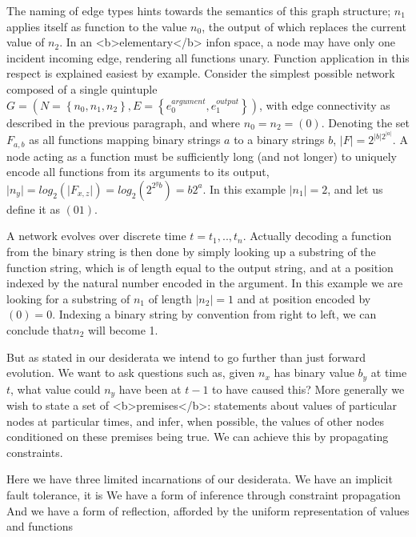 The naming of edge types hints towards the semantics of this graph structure; $n_1$ applies itself as function to the value $n_0$, the output of which replaces the current value of $n_2$.
In an <b>elementary</b> infon space, a node may have only one incident incoming edge, rendering all functions unary.
Function application in this respect is explained easiest by example.
Consider the simplest possible network composed of a single quintuple $G = (N=\left\{n_0, n_1, n_2\right\},E=\left\{e_0^{argument},e_1^{output}\right\})$, with edge connectivity as described in the previous paragraph, and where $n_0 = n_2 = (0)$.
Denoting the set $F_{a,b}$ as all functions mapping binary strings $a$ to a binary strings $b$, $\vert F \vert = 2^{{\vert b \vert}2^{\vert a \vert}}$.
A node acting as a function must be sufficiently long (and not longer) to uniquely encode all functions from its arguments to its output, $ \vert n_y \vert = log_2(\vert F_{x,z} \vert) = log_2\left(2^{2^yb}\right)=b2^a$.
In this example $\vert n_1 \vert = 2$, and let us define it as $(01)$.

A network evolves over discrete time $t=t_1,..,t_n$.
Actually decoding a function from the binary string is then done by simply looking up a substring of the function string, which is of length equal to the output string, and at a position indexed by the natural number encoded in the argument.
In this example we are looking for a substring of $n_1$ of length $\vert n_2 \vert = 1$ and at position encoded by $(0) = 0$.
Indexing a binary string by convention from right to left, we can conclude that$ n_2$ will become 1.

But as stated in our desiderata we intend to go further than just forward evolution.
We want to ask questions such as, given $n_x$ has binary value $b_y$ at time $t$, what value could $n_y$ have been at $t-1$ to have caused this?
More generally we wish to state a set of <b>premises</b>: statements about values of particular nodes at particular times, and infer, when possible, the values of other nodes conditioned on these premises being true.
We can achieve this by propagating constraints.

Here we have three limited incarnations of our desiderata.
We have an implicit fault tolerance, it is 
We have a form of inference through constraint propagation
And we have a form of reflection, afforded by the uniform representation of values and functions


